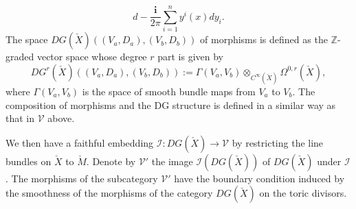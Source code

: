 \documentclass[12pt,reqno]{amsart}
\newcommand{\Z}{{\mathbb{Z}}}
\newcommand{\ii}{{\mathbf{i}}}
\newcommand{\cI}{{\mathcal{I}}}
\newcommand{\cV}{{\mathcal{V}}}
\theoremstyle{definition}
\begin{document}
\begin{equation*}
d-\frac{\ii}{2\pi}\sum_{i=1}^n y^i(x)dy_i.
\end{equation*}
The space $DG(\check{X})((V_a,D_a),(V_b,D_b))$ of morphisms is defined as the $\Z$-graded vector space whose degree $r$ part is given by
\begin{equation*}
DG^r(\check{X})((V_a,D_a),(V_b,D_b)) := \Gamma(V_a,V_b)\otimes_{C^\infty(\check{X})}\Omega^{0,r}(\check{X}),
\end{equation*}
where $\Gamma(V_a,V_b)$ is the space of smooth bundle maps from $V_a$ to $V_b$. The composition of morphisms and the DG structure is defined in a similar way as that in $\cV$ above. \par
We then have a faithful embedding $\cI:DG(\check{X})\to\cV$ by restricting the line bundles on $\check{X}$ to $\check{M}$. Denote by $\cV'$ the image $\cI(DG(\check{X}))$ of $DG(\check{X})$ under $\cI$.
The morphisms of the subcategory $\cV'$ have the boundary condition induced by the smoothness of the morphisms of the category $DG(\check{X})$ on the toric divisors.
\end{document}

